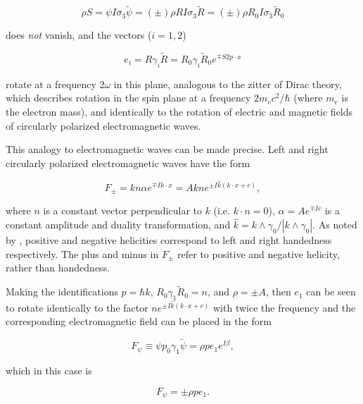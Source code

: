 \documentclass[twocolumn]{article}
\begin{document}
  \begin{equation}
    \rho S = \psi I \sigma_3 \widetilde \psi = (\pm) \rho  R I \sigma_3 \widetilde R = (\pm) \rho R_0 I \sigma_3 \widetilde R_0
  \end{equation}

  does \emph{not} vanish, and the vectors ($i = 1, 2$)

  \begin{equation}
    e_i = R \gamma_i \widetilde R = R_0 \gamma_i \widetilde R_0 e^{\mp S 2 p \cdot x}
  \end{equation} 

  rotate at a frequency $2 \omega$ in this plane, analogous to the zitter of Dirac theory, which describes rotation in the spin plane at a frequency $2 m_e c^2 / \hbar$ (where $m_e$ is the electron mass), and identically to the rotation of electric and magnetic fields of circularly polarized electromagnetic waves.

  This analogy to electromagnetic waves can be made precise. Left and right circularly polarized electromagnetic waves have the form\cite{gap}

    \begin{equation}
      F_\pm = k n \alpha e^{\mp I k \cdot x} = A k n e^{\pm I \hat k (k \cdot x + c)},\label{eq:emwaves}
    \end{equation}

    where $n$ is a constant vector perpendicular to $k$ (i.e. $k \cdot n= 0$), $\alpha = A e^{\mp I c}$ is a constant amplitude and duality transformation, and $\hat k = k \wedge \gamma_0 / |k \wedge \gamma_0|$. As noted by \cite{gap}, positive and negative helicities correspond to left and right handedness respectively. The plus and minus in $F_\pm$ refer to positive and negative helicity, rather than handedness.

    Making the identifications $p = \hbar k$, $R_0 \gamma_1 \widetilde R_0 = n$, and $\rho = \pm A$, then $e_1$ can be seen to rotate identically to the factor $n e^{\pm I \hat k (k \cdot x + c)}$ with twice the frequency and the corresponding electromagnetic field can be placed in the form

    \begin{equation}
      F_\psi \equiv \psi p_0 \gamma_1 \widetilde \psi = \rho p e_1 e^{I \beta}, \label{eq:emfield}
    \end{equation}

    which in this case is

    \begin{equation}
      F_\psi = \pm \rho p e_1.
    \end{equation}
\end{document}
